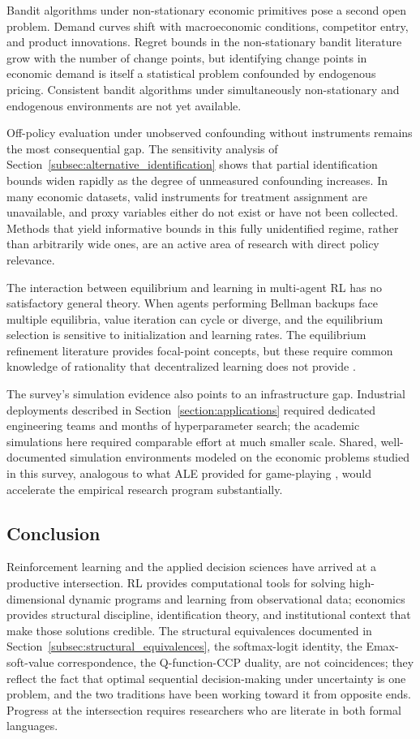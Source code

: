 Bandit algorithms under non-stationary economic primitives pose a second open problem.
Demand curves shift with macroeconomic conditions, competitor entry, and product innovations.
Regret bounds in the non-stationary bandit literature grow with the number of change points, but identifying change points in economic demand is itself a statistical problem confounded by endogenous pricing.
Consistent bandit algorithms under simultaneously non-stationary and endogenous environments are not yet available.

Off-policy evaluation under unobserved confounding without instruments remains the most consequential gap.
The sensitivity analysis of Section~\ref{subsec:alternative_identification} shows that partial identification bounds widen rapidly as the degree of unmeasured confounding increases.
In many economic datasets, valid instruments for treatment assignment are unavailable, and proxy variables either do not exist or have not been collected.
Methods that yield informative bounds in this fully unidentified regime, rather than arbitrarily wide ones, are an active area of research with direct policy relevance.

The interaction between equilibrium and learning in multi-agent RL has no satisfactory general theory.
When agents performing Bellman backups face multiple equilibria, value iteration can cycle or diverge, and the equilibrium selection is sensitive to initialization and learning rates.
The equilibrium refinement literature provides focal-point concepts, but these require common knowledge of rationality that decentralized learning does not provide \citep{FudenbergLevine1998}.

The survey's simulation evidence also points to an infrastructure gap.
Industrial deployments described in Section~\ref{section:applications} required dedicated engineering teams and months of hyperparameter search; the academic simulations here required comparable effort at much smaller scale.
Shared, well-documented simulation environments modeled on the economic problems studied in this survey, analogous to what ALE provided for game-playing \citep{mnih2015}, would accelerate the empirical research program substantially.

\subsection{Conclusion}

Reinforcement learning and the applied decision sciences have arrived at a productive intersection.
RL provides computational tools for solving high-dimensional dynamic programs and learning from observational data; economics provides structural discipline, identification theory, and institutional context that make those solutions credible.
The structural equivalences documented in Section~\ref{subsec:structural_equivalences}, the softmax-logit identity, the Emax-soft-value correspondence, the Q-function-CCP duality, are not coincidences; they reflect the fact that optimal sequential decision-making under uncertainty is one problem, and the two traditions have been working toward it from opposite ends.
Progress at the intersection requires researchers who are literate in both formal languages.
